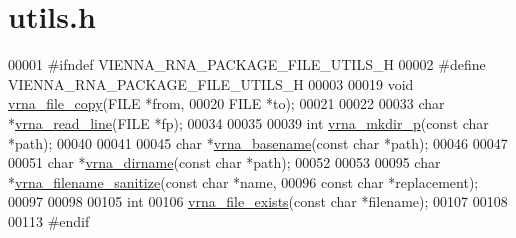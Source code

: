 \hypertarget{io_2utils_8h_source}{}\section{utils.\+h}
\label{io_2utils_8h_source}

\begin{DoxyCode}
00001 \textcolor{preprocessor}{#ifndef VIENNA\_RNA\_PACKAGE\_FILE\_UTILS\_H}
00002 \textcolor{preprocessor}{#define VIENNA\_RNA\_PACKAGE\_FILE\_UTILS\_H}
00003 
00019 \textcolor{keywordtype}{void} \hyperlink{group__file__utils_ga4382a56d2fee9ed738364b99329edc7c}{vrna\_file\_copy}(FILE  *from,
00020                     FILE  *to);
00021 
00022 
00033 \textcolor{keywordtype}{char} *\hyperlink{group__file__utils_gad16c270b70a77c753088b29de8a802dc}{vrna\_read\_line}(FILE *fp);
00034 
00035 
00039 \textcolor{keywordtype}{int} \hyperlink{group__file__utils_gacfa44a974272a4d42c5d391cc780a0ec}{vrna\_mkdir\_p}(\textcolor{keyword}{const} \textcolor{keywordtype}{char} *path);
00040 
00041 
00045 \textcolor{keywordtype}{char} *\hyperlink{group__file__utils_ga8d0f8f84f1e2628172cf3c8648b2e507}{vrna\_basename}(\textcolor{keyword}{const} \textcolor{keywordtype}{char} *path);
00046 
00047 
00051 \textcolor{keywordtype}{char} *\hyperlink{group__file__utils_gae006d31b088d52d8aace86948def5fe8}{vrna\_dirname}(\textcolor{keyword}{const} \textcolor{keywordtype}{char} *path);
00052 
00053 
00095 \textcolor{keywordtype}{char} *\hyperlink{group__file__utils_ga72eae0a472bad905b6facccf5b453a76}{vrna\_filename\_sanitize}(\textcolor{keyword}{const} \textcolor{keywordtype}{char} *name,
00096                              \textcolor{keyword}{const} \textcolor{keywordtype}{char} *replacement);
00097 
00098 
00105 \textcolor{keywordtype}{int}
00106 \hyperlink{group__file__utils_ga80cf1f4bb5704622f72f2911f48aee55}{vrna\_file\_exists}(\textcolor{keyword}{const} \textcolor{keywordtype}{char} *filename);
00107 
00108 
00113 \textcolor{preprocessor}{#endif}
\end{DoxyCode}
